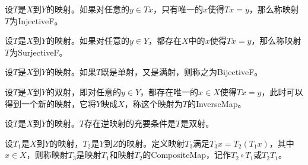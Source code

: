 \begin{definition}
	设$T$是$X$到$Y$的映射。如果对任意的$y\in Tx$，只有唯一的$x$使得$Tx=y$，那么称映射$T$为\gls{InjectiveF}。
\end{definition}
\begin{definition}
	设$T$是$X$到$Y$的映射。如果对任意的$y\in Y$，都存在$X$中的$x$使得$Tx=y$，那么称映射$T$为\gls{SurjectiveF}。
\end{definition}
\begin{definition}
	设$T$是$X$到$Y$的映射。如果$T$既是单射，又是满射，则称之为\gls{BijectiveF}。
\end{definition}
\begin{definition}
	设$T$是$X$到$Y$的双射，即对任意的$y\in Y$，都存在唯一的$x\in X$使得$Tx=y$，此时可以得到一个新的映射，它将$Y$映成$X$，称这个映射为$T$的\gls{InverseMap}。
\end{definition}
\begin{theorem}
	设$T$是$X$到$Y$的映射。$T$存在逆映射的充要条件是$T$是双射。
\end{theorem}
\begin{definition}
	设$T_1$是$X$到$Y$的映射，$T_2$是$Y$到$Z$的映射。定义映射$T_3$满足$T_3x=T_2(T_1x)$，其中$x\in X$，则称映射$T_3$是映射$T_1$和映射$T_2$的\gls{CompositeMap}，记作$T_2\circ T_1$或$T_2T_1$。
\end{definition}

